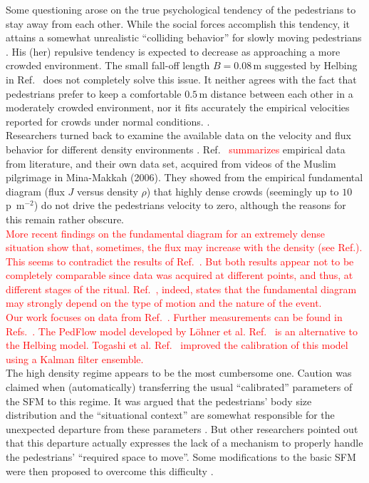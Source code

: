 \documentclass[preprint,12pt]{elsarticle}
\begin{document}
Some questioning arose on the true psychological tendency of the pedestrians to 
stay away from each other. While the social forces accomplish this tendency, it 
attains a somewhat unrealistic ``colliding behavior'' for slowly moving 
pedestrians \cite{Lakoba}. His (her) repulsive tendency is expected to decrease 
as approaching a more crowded environment. The small fall-off length $B=0.08\,$m 
suggested by Helbing in Ref.~\cite{Helbing1} does not completely solve this 
issue. It neither agrees with the fact that pedestrians prefer to keep a 
comfortable $0.5\,$m distance between each other in a moderately crowded 
environment, nor it fits accurately the empirical velocities reported for 
crowds under normal conditions. \cite{Lakoba}.  \\

Researchers turned back to examine the available data on the velocity and flux 
behavior for different density environments \cite{Boltes,helbing3,seyfried1,seyfried}. 
Ref.~\cite{helbing3} \textcolor{red}{summarizes} empirical data from 
literature, and their own data set, acquired from videos of the Muslim 
pilgrimage in Mina-Makkah (2006). They showed from the empirical fundamental 
diagram (flux $J$ versus density $\rho$) that highly dense crowds (seemingly up 
to $10\,$p~m$^{-2}$) do not drive the pedestrians velocity to zero, although the 
reasons for this remain rather obscure.   \\

\textcolor{red}{More recent findings on the fundamental diagram for an extremely dense
 situation show that, sometimes, the flux may increase with the density (see Ref.\cite{lohner1}). 
This seems to contradict the results of Ref.~\cite{helbing3}. But both results appear 
not to be completely  comparable since data was acquired at different points, and thus,
at different stages of the ritual. Ref.~\cite{lohner1}, indeed, states that the fundamental 
diagram may strongly depend on the type of motion and the nature of the event.}\\


\textcolor{red}{ Our work focuses on data from Ref.~\cite{helbing3}. 
Further measurements can be found in Refs.~\cite{Boltes,Dridi1,Dridi2,Baqui1,lohner1}.
The PedFlow model developed by L\"ohner et al. Ref.~\cite{lohner2}  
is an alternative to the Helbing model. Togashi et al.  Ref.~\cite{Togashi1} 
improved the calibration of this model using a Kalman filter ensemble. }\\

The high density regime appears to be the most cumbersome one. Caution was 
claimed when (automatically) transferring the usual ``calibrated'' parameters 
of the SFM to this regime. It was argued that the pedestrians' body size 
distribution and the ``situational context'' are somewhat responsible for the 
unexpected departure from these parameters \cite{johansson1,kwak}. But other 
researchers pointed out that this departure actually expresses the lack of a 
mechanism to properly handle the pedestrians' ``required space to move''. Some 
modifications to the basic SFM were then proposed to overcome this difficulty 
\cite{parisi2,seyfried2}. \\
\end{document}

